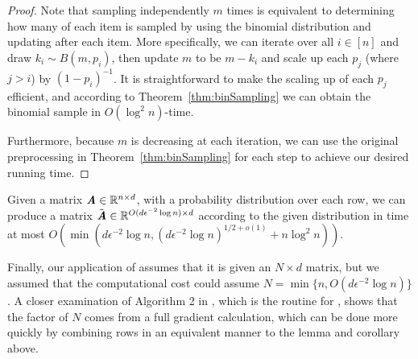 \begin{proof}
	Note that sampling independently $m$ times is equivalent to determining how many of each item is sampled by using the binomial distribution and updating after each item. More specifically, we can iterate over all $i \in [n]$ and draw $k_i \sim B(m,p_i)$, then update $m$ to be $m - k_i$ and scale up each $p_j$ (where $j > i$) by $(1-p_i)^{-1}$. It is straightforward to make the scaling up of each $p_j$ efficient, and according to Theorem~\ref{thm:binSampling} we can obtain the binomial sample in $O(\log^2{n})$-time.
	
	
	Furthermore, because $m$ is decreasing at each iteration, we can use the original preprocessing in Theorem~\ref{thm:binSampling} for each step to achieve our desired running time.	
\end{proof}


\begin{corollary}\label{cor:sampleEfficiently}
	Given a matrix $\boldsymbol{\mathit{A}} \in \mathbb{R}^{n \times d}$, with a probability distribution over each row, we can produce a matrix
	$\tilde{\boldsymbol{\mathit{A}}} \in \mathbb{R}^{O(d\epsilon^{-2}\log{n})\times d}$ according to the given distribution in time at most
	$O\left(\min(d\epsilon^{-2}\log{n}, (d\epsilon^{-2}\log{n})^{1/2 + o(1)} + n\log^2{n})\right).$
\end{corollary}

Finally, our application of  assumes that it is given an $N \times d$ matrix, but we assumed that the computational cost could assume $N = \min\{n,O(d\epsilon^{-2}\log{n})\}$. A closer examination of Algorithm 2 in \cite{AllenZhu17}, which is the routine for , shows that the factor of $N$ comes from a full gradient calculation, which can be done more quickly by combining rows in an equivalent manner to the lemma and corollary above.